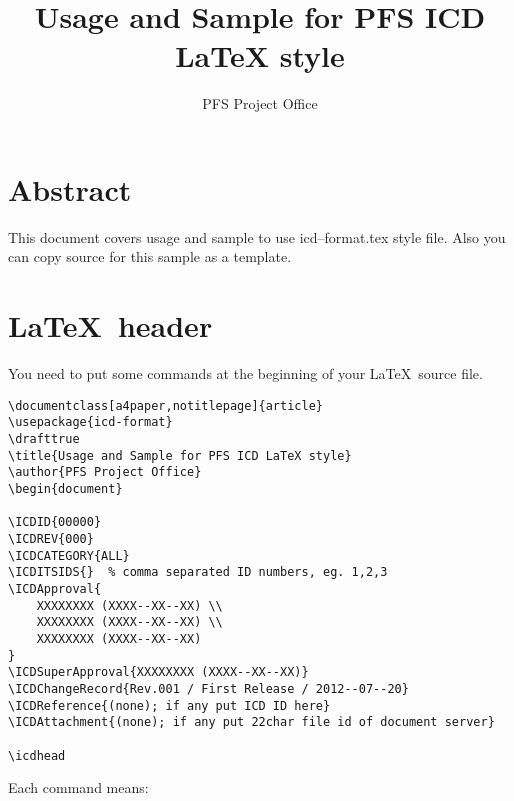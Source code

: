 \documentclass[a4paper,notitlepage]{article}
\title{Usage and Sample for PFS ICD LaTeX style}
\author{PFS Project Office}
\begin{document}
\ICDITSIDS{}  %


\icdhead

\section{Abstract}

This document covers usage and sample to use icd--format.tex style file. 
Also you can copy source for this sample as a template. 


\section{\LaTeX\ header}

You need to put some commands at the beginning of your \LaTeX\ source file. 

\begin{verbatim}
\documentclass[a4paper,notitlepage]{article}
\usepackage{icd-format}
\drafttrue
\title{Usage and Sample for PFS ICD LaTeX style}
\author{PFS Project Office}
\begin{document}

\ICDID{00000}
\ICDREV{000}
\ICDCATEGORY{ALL}
\ICDITSIDS{}  % comma separated ID numbers, eg. 1,2,3
\ICDApproval{
    XXXXXXXX (XXXX--XX--XX) \\
    XXXXXXXX (XXXX--XX--XX) \\
    XXXXXXXX (XXXX--XX--XX)
}
\ICDSuperApproval{XXXXXXXX (XXXX--XX--XX)}
\ICDChangeRecord{Rev.001 / First Release / 2012--07--20}
\ICDReference{(none); if any put ICD ID here}
\ICDAttachment{(none); if any put 22char file id of document server}

\icdhead
\end{verbatim}

Each command means: 
\end{document}
